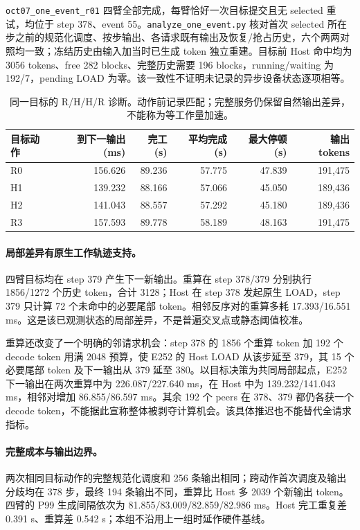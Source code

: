 \documentclass[UTF8,fontset=fandol,a4paper,10pt]{ctexart}
\newcommand{\code}[1]{\nolinkurl{#1}}
\begin{document}
\code{oct07_one_event_r01} 四臂全部完成，每臂恰好一次目标提交且无 selected 重试，均位于 step 378、event 55。\code{analyze_one_event.py} 核对首次 selected 所在步之前的规范化调度、按步输出、各请求既有输出及恢复/抢占历史，六个两两对照均一致；冻结历史由输入加当时已生成 token 独立重建。目标前 Host 命中均为 3056 tokens、free 282 blocks、完整历史需要 196 blocks，running/waiting 为 192/7，pending LOAD 为零。该一致性不证明未记录的异步设备状态逐项相等。

\begin{table}[ht]
\centering\small
\caption{同一目标的 R/H/H/R 诊断。动作前记录匹配；完整服务仍保留自然输出差异，不能称为等工作量加速。}
\label{tab:oneevent}
\begin{tabular}{@{}lrrrrr@{}}
\toprule
目标动作 & 到下一输出(ms) & 完工(s) & 平均完成(s) & 最大停顿(s) & 输出 tokens \\
\midrule
R0 & 156.626 & 89.236 & 57.775 & 47.839 & 191,475 \\
H1 & 139.232 & 88.166 & 57.066 & 45.050 & 189,436 \\
H2 & 141.043 & 88.557 & 57.292 & 45.180 & 189,436 \\
R3 & 157.593 & 89.778 & 58.189 & 48.163 & 191,475 \\
\bottomrule
\end{tabular}
\end{table}

\paragraph{局部差异有原生工作轨迹支持。}
四臂目标均在 step 379 产生下一新输出。重算在 step 378/379 分别执行 1856/1272 个历史 token，合计 3128；Host 在 step 378 发起原生 LOAD，step 379 只计算 72 个未命中的必要尾部 token。相邻反序对的重算多耗 17.393/16.551 ms。这是该已观测状态的局部差异，不是普遍交叉点或静态阈值校准。

重算还改变了一个明确的邻请求机会：step 378 的 1856 个重算 token 加 192 个 decode token 用满 2048 预算，使 E252 的 Host LOAD 从该步延至 379，其 15 个必要尾部 token 及下一输出从 379 延至 380。以目标决策为共同局部起点，E252 下一输出在两次重算中为 226.087/227.640 ms，在 Host 中为 139.232/141.043 ms，相邻对增加 86.855/86.597 ms。其余 192 个 peers 在 378、379 都仍各获一个 decode token，不能据此宣称整体被剥夺计算机会。该具体推迟也不能替代全请求指标。

\paragraph{完整成本与输出边界。}
两次相同目标动作的完整规范化调度和 256 条输出相同；跨动作首次调度及输出分歧均在 378 步，最终 194 条输出不同，重算比 Host 多 2039 个新输出 token。四臂的 P99 生成间隔依次为 81.855/83.009/82.859/82.986 ms。Host 完工重复差 0.391 s、重算差 0.542 s；本组不沿用上一组时延作硬件基线。
\end{document}
